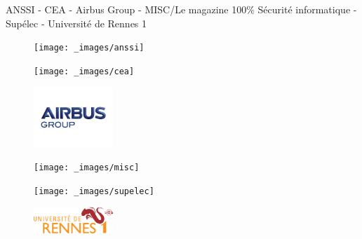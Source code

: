 \begin{center}
ANSSI -  CEA - Airbus Group - MISC/Le magazine 100\% S\'ecurit\'e informatique - Sup\'elec - Universit\'e de Rennes 1
\end{center}

\begin{figure}[h]
\begin{center}
\parbox{3cm}{\texttt{[image: \_images/anssi]}}
\hfill
\parbox{3cm}{\texttt{[image: \_images/cea]}}
\hfill
\parbox{3cm}{\includegraphics[width=3cm]{_images/airbus}}
\end{center}
\vfill
\begin{center}
\parbox{3cm}{\texttt{[image: \_images/misc]}}
\hfill
\parbox{3cm}{\texttt{[image: \_images/supelec]}}
\hfill
\parbox{3cm}{\includegraphics[width=3cm]{_images/uni-rennes1}}
\end{center}
\end{figure}

